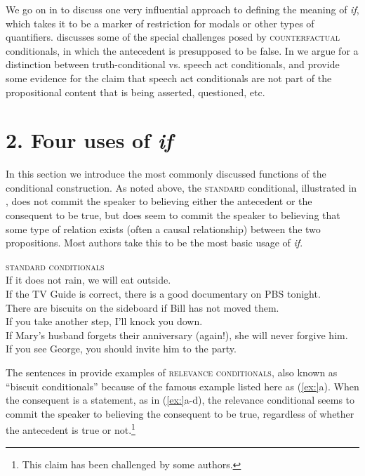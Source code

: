 We go on in  to discuss one very influential approach to defining the meaning of \textit{if}, which takes it to be a marker of restriction for modals or other types of quantifiers.  discusses some of the special challenges posed by \textsc{counterfactual} conditionals, in which the antecedent is presupposed to be false. In  we argue for a distinction between truth-conditional vs. speech act conditionals, and provide some evidence for the claim that speech act conditionals are not part of the propositional content that is being asserted, questioned, etc.


\section{2. Four uses of \textit{if}}\label{sec:}

In this section we introduce the most commonly discussed functions of the conditional construction. As noted above, the \textsc{standard} conditional, illustrated in , does not commit the speaker to believing either the antecedent or the consequent to be true, but does seem to commit the speaker to believing that some type of relation exists (often a causal relationship) between the two propositions. Most authors take this to be the most basic usage of \textit{if}.


\ea
\textsc{standard conditionals}\\
\ea If it does not rain, we will eat outside.\\
\ex If the TV Guide is correct, there is a good documentary on PBS tonight.\\
\ex There are biscuits on the sideboard if Bill has not moved them.\\
\ex If you take another step, I’ll knock you down.\\
\ex If Mary’s husband forgets their anniversary (again!), she will never forgive him.\\
\ex If you see George, you should invite him to the party.
                       \z
\z


The sentences in  provide examples of \textsc{relevance} \textsc{conditionals}, also known as “biscuit conditionals” because of the famous example listed here as (\ref{ex:}a). When the consequent is a statement, as in (\ref{ex:}a-d), the relevance conditional seems to commit the speaker to believing the consequent to be true, regardless of whether the antecedent is true or not.\footnote{This claim has been challenged by some authors.}


